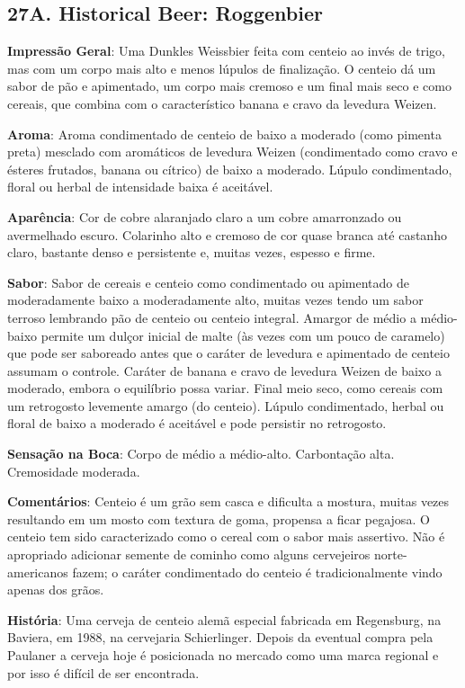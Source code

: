 \subsection*{27A. Historical Beer: Roggenbier}
\textbf{Impressão Geral}: Uma Dunkles Weissbier feita com centeio ao invés de trigo, mas com um corpo mais alto e menos lúpulos de finalização. O centeio dá um sabor de pão e apimentado, um corpo mais cremoso e um final mais seco e como cereais, que combina com o característico banana e cravo da levedura Weizen.

\textbf{Aroma}: Aroma condimentado de centeio de baixo a moderado (como pimenta preta) mesclado com aromáticos de levedura Weizen (condimentado como cravo e ésteres frutados, banana ou cítrico) de baixo a moderado. Lúpulo condimentado, floral ou herbal de intensidade baixa é aceitável.

\textbf{Aparência}: Cor de cobre alaranjado claro a um cobre amarronzado ou avermelhado escuro. Colarinho alto e cremoso de cor quase branca até castanho claro, bastante denso e persistente e, muitas vezes, espesso e firme.

\textbf{Sabor}: Sabor de cereais e centeio como condimentado ou apimentado de moderadamente baixo a moderadamente alto, muitas vezes tendo um sabor terroso lembrando pão de centeio ou centeio integral. Amargor de médio a médio-baixo permite um dulçor inicial de malte (às vezes com um pouco de caramelo) que pode ser saboreado antes que o caráter de levedura e apimentado de centeio assumam o controle. Caráter de banana e cravo de levedura Weizen de baixo a moderado, embora o equilíbrio possa variar. Final meio seco, como cereais com um retrogosto levemente amargo (do centeio). Lúpulo condimentado, herbal ou floral de baixo a moderado é aceitável e pode persistir no retrogosto.

\textbf{Sensação na Boca}: Corpo de médio a médio-alto. Carbontação alta. Cremosidade moderada.

\textbf{Comentários}: Centeio é um grão sem casca e dificulta a mostura, muitas vezes resultando em um mosto com textura de goma, propensa a ficar pegajosa. O centeio tem sido caracterizado como o cereal com o sabor mais assertivo. Não é apropriado adicionar semente de cominho como alguns cervejeiros norte-americanos fazem; o caráter condimentado do centeio é tradicionalmente vindo apenas dos grãos.

\textbf{História}: Uma cerveja de centeio alemã especial fabricada em Regensburg, na Baviera, em 1988, na cervejaria Schierlinger. Depois da eventual compra pela Paulaner a cerveja hoje é posicionada no mercado como uma marca regional e por isso é difícil de ser encontrada.

